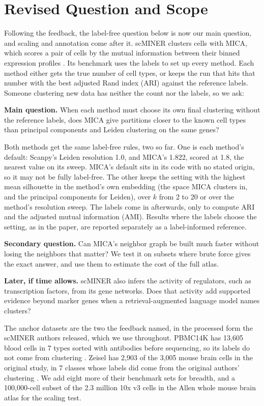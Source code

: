 \section{Revised Question and Scope}\label{sec:question}
Following the feedback, the label-free question below is now our main question, and scaling and annotation come after it. scMINER clusters cells with MICA, which scores a pair of cells by the mutual information between their binned expression profiles \cite{pan2025scminer}. Its benchmark uses the labels to set up every method. Each method either gets the true number of cell types, or keeps the run that hits that number with the best adjusted Rand index (ARI) against the reference labels. Someone clustering new data has neither the count nor the labels, so we ask:

\textbf{Main question.} When each method must choose its own final clustering without the reference labels, does MICA give partitions closer to the known cell types than principal components and Leiden clustering \cite{traag2019louvain} on the same genes?

Both methods get the same label-free rules, two so far. One is each method's default: Scanpy's Leiden resolution 1.0, and MICA's 1.822, scored at 1.8, the nearest value on its sweep. MICA's default sits in its code with no stated origin, so it may not be fully label-free. The other keeps the setting with the highest mean silhouette in the method's own embedding (the space MICA clusters in, and the principal components for Leiden), over $k$ from 2 to 20 or over the method's resolution sweep. The labels come in afterwards, only to compute ARI and the adjusted mutual information (AMI). Results where the labels choose the setting, as in the paper, are reported separately as a label-informed reference.

\textbf{Secondary question.} Can MICA's neighbor graph be built much faster without losing the neighbors that matter? We test it on subsets where brute force gives the exact answer, and use them to estimate the cost of the full atlas.

\textbf{Later, if time allows.} scMINER also infers the activity of regulators, such as transcription factors, from its gene networks. Does that activity add supported evidence beyond marker genes when a retrieval-augmented language model names clusters?

The anchor datasets are the two the feedback named, in the processed form the scMINER authors released, which we use throughout. PBMC14K has 13,605 blood cells in 7 types sorted with antibodies before sequencing, so its labels do not come from clustering \cite{zheng2017massively}. Zeisel has 2,903 of the 3,005 mouse brain cells in the original study, in 7 classes whose labels did come from the original authors' clustering \cite{zeisel2015cell}. We add eight more of their benchmark sets for breadth, and a 100,000-cell subset of the 2.3 million 10x v3 cells in the Allen whole mouse brain atlas \cite{yao2023allen} for the scaling test.

